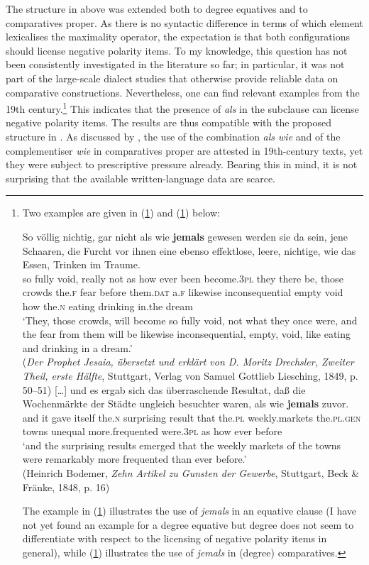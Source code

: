 The structure in  above was extended both to degree equatives and to comparatives proper. As there is no syntactic difference in terms of which element lexicalises the maximality operator, the expectation is that both configurations should license negative polarity items. To my knowledge, this question has not been consistently investigated in the literature so far; in particular, it was not part of the large-scale dialect studies that otherwise provide reliable data on comparative constructions. Nevertheless, one can  find relevant examples from the 19th century.\footnote{Two examples are given in (\ref{alswiejemalsequat}) and (\ref{alswiejemalscompr}) below:

\ea \gll So völlig nichtig, gar nicht als wie \textbf{jemals} gewesen werden sie da sein, jene Schaaren, die Furcht vor ihnen eine ebenso effektlose, leere, nichtige, wie das Essen, Trinken im Traume. \label{alswiejemalsequat}\\
so fully void, really not as how ever been become.\textsc{3pl} they there be, those crowds the.\textsc{f} fear before them.\textsc{dat} a.\textsc{f} likewise inconsequential empty void how the.\textsc{n} eating drinking in.the dream\\
\glt `They, those crowds, will become so fully void, not what they once were, and the fear from them will be likewise inconsequential, empty, void, like eating and drinking in a dream.'\\(\textit{Der Prophet Jesaia, übersetzt und erklärt von D. Moritz Drechsler, Zweiter Theil, erste Hälfte}, Stuttgart, Verlag von Samuel Gottlieb Liesching, 1849, p. 50--51)
\ex \gll {}[\ldots{}] und es ergab sich das überraschende Resultat, daß die Wochenmärkte der Städte ungleich besuchter waren, als wie \textbf{jemals} zuvor. \label{alswiejemalscompr}\\
{} and it gave itself the.\textsc{n} surprising result that the.\textsc{pl} weekly.markets the.\textsc{pl.gen} towns unequal more.frequented were.\textsc{3pl} as how ever before\\
\glt `and the surprising results emerged that the weekly markets of the towns were remarkably more frequented than ever before.'\\(Heinrich Bodemer, \textit{Zehn Artikel zu Gunsten der Gewerbe}, Stuttgart, Beck \& Fränke, 1848, p. 16)
\z

The example in (\ref{alswiejemalsequat}) illustrates the use of \textit{jemals} in an equative clause (I have not yet found an example for a degree equative but degree does not seem to differentiate with respect to the licensing of negative polarity items in general), while (\ref{alswiejemalscompr}) illustrates the use of \textit{jemals} in (degree) comparatives.} This indicates that the presence of \textit{als} in the subclause can license negative polarity items. The results are thus compatible with the proposed structure in . As discussed by \citet{jaeger2018}, the use of the combination \textit{als wie} and of the complementiser \textit{wie} in comparatives proper are attested in 19th-century texts, yet they were subject to prescriptive pressure already. Bearing this in mind, it is not surprising that the available written-language data are scarce.

